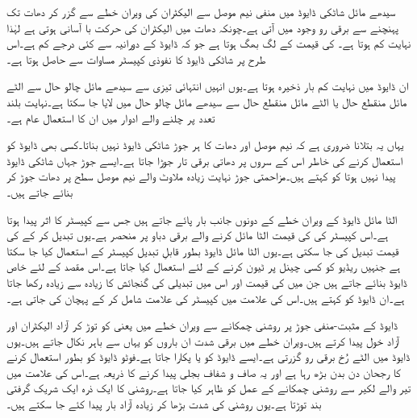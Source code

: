 سیدھے مائل شاٹکی ڈایوڈ میں منفی نیم موصل سے الیکٹران کی ویران خطے سے گزر کر دھات تک پہنچنے سے برقی رو وجود میں آتی ہے۔چونکہ دھات میں الیکٹران کی حرکت  با آسانی ہوتی ہے لہٰذا   نہایت کم ہوتا ہے۔ کی قیمت  کے لگ بھگ ہوتا ہے جو کہ  ڈایوڈ کے  دورانیہ سے کئی درجے کم ہے۔اس طرح  پر شاٹکی ڈایوڈ کا نفوذی کپیسٹر مساوات   سے  حاصل ہوتا  ہے۔  

ان ڈایوڈ میں نہایت کم بار ذخیرہ ہوتا ہے۔یوں انہیں انتہائی تیزی سے سیدھے مائل چالو حال سے الٹے مائل منقطع حال یا الٹے مائل منقطع حال سے سیدھے مائل چالو حال میں لایا جا سکتا ہے۔نہایت بلند تعدد پر چلنے والے ادوار میں ان کا استعمال عام ہے۔   

یہاں یہ بتلانا ضروری ہے کہ نیم موصل اور دھات کا ہر جوڑ شاٹکی ڈایوڈ نہیں بناتا۔کسی بھی ڈایوڈ کو استعمال کرنے کی خاطر اس کے سروں پر دھاتی برقی تار جوڑا جاتا ہے۔ایسے جوڑ جہاں شاٹکی ڈایوڈ پیدا نہیں ہوتا کو   کہتے ہیں۔مزاحمتی جوڑ نہایت زیادہ ملاوٹ والے  نیم موصل سطح پر دھات جوڑ کر بنائے جاتے ہیں۔


الٹا مائل ڈایوڈ کے ویران خطے کے دونوں جانب بار پائے جاتے ہیں جس سے کپیسٹر کا اثر پیدا ہوتا ہے۔اس کپیسٹر   کی کی قیمت الٹا مائل کرنے والے برقی دباو  پر منحصر ہے۔یوں  تبدیل کر کے   کی قیمت تبدیل کی جا سکتی ہے۔یوں الٹا مائل ڈایوڈ بطور قابلِ تبدیل کپیسٹر کے استعمال کیا جا سکتا ہے جنہیں ریڈیو کو کسی چینل پر ٹیون کرنے کے لئے استعمال کیا جاتا ہے۔اس مقصد کے لئے خاص ڈایوڈ بنائے جاتے ہیں جن میں  کی قیمت اور اس میں تبدیلی کی گنجائش کا زیادہ سے زیادہ رکھا جاتا ہے۔ان ڈایوڈ کو   کہتے ہیں۔اس کی علامت میں کپیسٹر کی علامت شامل کر کے پہچان کی جاتی ہے۔

ڈایوڈ کے مثبت-منفی جوڑ پر روشنی چمکانے سے ویران خطے میں   یعنی    کو توڑ کر آزاد الیکٹران اور آزاد خول پیدا کرتے ہیں۔ویران خطے میں برقی شدت ان باروں کو یہاں سے باہر نکال جاتے ہیں۔یوں ڈایوڈ میں الٹے رُخ برقی رو گزرتی ہے۔ایسے ڈایوڈ کو  یا  پکارا جاتا ہے۔فوٹو ڈایوڈ کو بطور  استعمال کرنے کا رجحان دن بدن بڑھ رہا ہے اور یہ صاف و شفاف بجلی پیدا کرنے کا ذریعہ ہے۔اس کی علامت میں تیر والے لکیر سے روشنی چمکانے کے عمل کو ظاہر کیا جاتا ہے۔روشنی کا ایک ذرہ  ایک شریک گرفتی بند توڑتا ہے۔یوں روشنی کی شدت بڑھا کر زیادہ آزاد بار پیدا کئے جا سکتے ہیں۔

